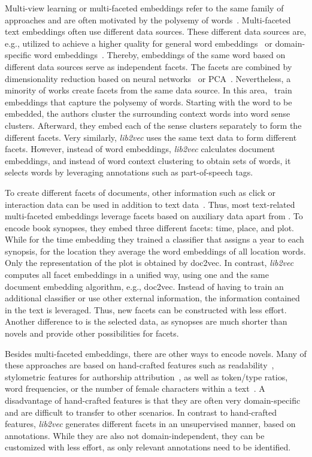 \documentclass[11pt]{article}
\begin{document}
Multi-view learning or multi-faceted embeddings refer to the same family of approaches and are often motivated by the polysemy of words~\citep{neelakantan_efficient_2014}.
Multi-faceted text embeddings often use different data sources.
These different data sources are, e.g., utilized to achieve a higher quality for general word embeddings~\citep{luo_pre-trained_2014} or domain-specific word embeddings~\citep{rettig_fusing_2019}.
Thereby, embeddings of the same word based on different data sources serve as independent facets.
The facets are combined by dimensionality reduction based on neural networks~\citep{luo_pre-trained_2014} or PCA~\citep{rettig_fusing_2019}.
Nevertheless, a minority of works create facets from the same data source.
In this area,~\citet{neelakantan_efficient_2014} train embeddings that capture the polysemy of words.
Starting with the word to be embedded, the authors cluster the surrounding context words into word sense clusters.
Afterward, they embed each of the sense clusters separately to form the different facets.
Very similarly, \emph{lib2vec} uses the same text data to form different facets.
However, instead of word embeddings, \emph{lib2vec} calculates document embeddings, and instead of word context clustering to obtain sets of words, it selects words by leveraging annotations such as part-of-speech tags.

To create different facets of documents, other information such as click or interaction data can be used in addition to text data~\citep{sang_multi-modal_2019,li_multi-view_2019}.
Thus, most text-related multi-faceted embeddings leverage facets based on auxiliary data apart from \citet{risch_book_2018}.
To encode book synopses, they embed three different facets: time, place, and plot.
While for the time embedding they trained a classifier that assigns a year to each synopsis, for the location they average the word embeddings of all location words. 
Only the representation of the plot is obtained by doc2vec.
In contrast, \emph{lib2vec} computes all facet embeddings in a unified way, using one and the same document embedding algorithm, e.g., doc2vec.
Instead of having to train an additional classifier or use other external information, the information contained in the text is leveraged. 
Thus, new facets can be constructed with less effort.
Another difference to \citet{risch_book_2018} is the selected data, as synopses are much shorter than novels and provide other possibilities for facets.

Besides multi-faceted embeddings, there are other ways to encode novels.
Many of these approaches are based on hand-crafted features such as readability~\citep{pera_what_2013}, stylometric features for authorship attribution~\citep{alharthi_authorship_2018}, as well as token/type ratios, word frequencies, or the number of female characters within a text~\citep{alharthi_study_2019}.
A disadvantage of hand-crafted features is that they are often very domain-specific and are difficult to transfer to other scenarios.
In contrast to hand-crafted features, \emph{lib2vec} generates different facets in an unsupervised manner, based on annotations. 
While they are also not domain-independent, they can be customized with less effort, as only relevant annotations need to be identified.
\end{document}
